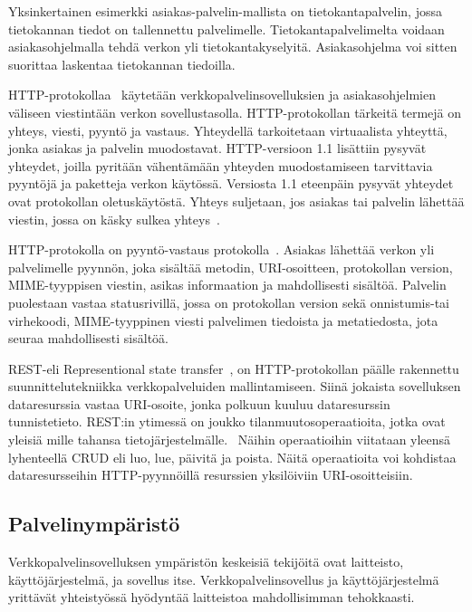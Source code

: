 \documentclass[finnish]{tktltiki2}
\theoremstyle{definition}
\theoremstyle{remark}
\begin{document}
Yksinkertainen esimerkki asiakas-palvelin-mallista on tietokantapalvelin,
jossa tietokannan tiedot on tallennettu palvelimelle. Tietokantapalvelimelta
voidaan asiakasohjelmalla tehdä verkon yli tietokantakyselyitä. Asiakasohjelma
voi sitten suorittaa laskentaa tietokannan tiedoilla.


HTTP-protokollaa~\cite{leach_hypertext} käytetään verkkopalvelinsovelluksien ja
asiakasohjelmien väliseen viestintään verkon sovellustasolla.
HTTP-protokollan tärkeitä termejä on yhteys, viesti, pyyntö ja vastaus.
Yhteydellä tarkoitetaan virtuaalista yhteyttä, jonka asiakas ja palvelin muodostavat.
HTTP-versioon 1.1 lisättiin pysyvät yhteydet, joilla pyritään
vähentämään yhteyden muodostamiseen tarvittavia pyyntöjä ja paketteja verkon
käytössä. Versiosta 1.1 eteenpäin pysyvät yhteydet ovat protokollan
oletuskäytöstä. Yhteys suljetaan, jos asiakas tai palvelin lähettää
viestin, jossa on käsky sulkea yhteys~\cite{leach_hypertext}.

HTTP-protokolla on pyyntö-vastaus protokolla~\cite{leach_hypertext}. Asiakas lähettää
verkon yli palvelimelle pyynnön, joka sisältää metodin, URI-osoitteen, protokollan
version, MIME-tyyppisen viestin, asikas informaation ja mahdollisesti
sisältöä. Palvelin puolestaan vastaa statusrivillä, jossa on protokollan
version sekä onnistumis-tai virhekoodi, MIME-tyyppinen viesti palvelimen
tiedoista ja metatiedosta, jota seuraa mahdollisesti sisältöä.


REST-eli Representional state transfer~\cite{battle_bridging_2008}, on HTTP-protokollan
päälle rakennettu suunnittelutekniikka verkkopalveluiden mallintamiseen.
Siinä jokaista sovelluksen dataresurssia vastaa URI-osoite,
jonka polkuun kuuluu dataresurssin tunnistetieto.
REST:in ytimessä on joukko tilanmuutosoperaatioita,
jotka ovat yleisiä mille tahansa tietojärjestelmälle. 
Näihin operaatioihin viitataan yleensä lyhenteellä CRUD eli 
luo, lue, päivitä ja poista.
Näitä operaatioita voi kohdistaa dataresursseihin
HTTP-pyynnöillä resurssien yksilöiviin URI-osoitteisiin.


\subsection{Palvelinympäristö}
Verkkopalvelinsovelluksen ympäristön keskeisiä
tekijöitä ovat laitteisto, käyttöjärjestelmä, ja sovellus itse.
Verkkopalvelinsovellus ja käyttöjärjestelmä
yrittävät yhteistyössä hyödyntää laitteistoa
mahdollisimman tehokkaasti.
\end{document}
